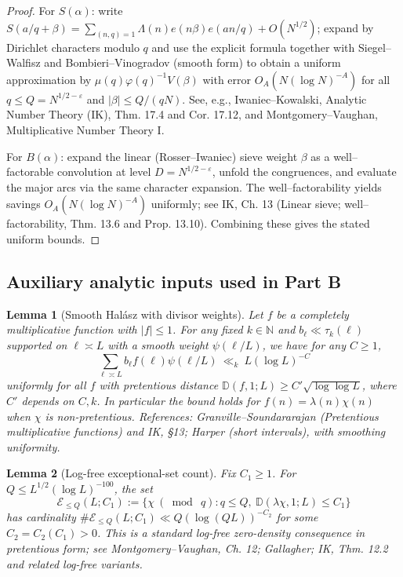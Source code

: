 \documentclass[11pt]{article}
\newtheorem{lemma}{Lemma}[part]
\theoremstyle{definition}
\theoremstyle{remark}
\numberwithin{equation}{part}
\begin{document}
\begin{proof}
	For $S(\alpha)$: write $S(a/q+\beta)=\sum_{(n,q)=1}\Lambda(n)e(n\beta)e(an/q)+O(N^{1/2})$; expand by Dirichlet characters modulo $q$ and use the explicit formula together with Siegel--Walfisz and Bombieri--Vinogradov (smooth form) to obtain a uniform approximation by $\mu(q)\varphi(q)^{-1}V(\beta)$ with error $O_A(N(\log N)^{-A})$ for all $q\le Q=N^{1/2-\varepsilon}$ and $|\beta|\le Q/(qN)$. See, e.g., Iwaniec--Kowalski, Analytic Number Theory (IK), Thm. 17.4 and Cor. 17.12, and Montgomery--Vaughan, Multiplicative Number Theory I.

	For $B(\alpha)$: expand the linear (Rosser--Iwaniec) sieve weight $\beta$ as a well--factorable convolution at level $D=N^{1/2-\varepsilon}$, unfold the congruences, and evaluate the major arcs via the same character expansion. The well--factorability yields savings $O_A(N(\log N)^{-A})$ uniformly; see IK, Ch. 13 (Linear sieve; well--factorability, Thm. 13.6 and Prop. 13.10). Combining these gives the stated uniform bounds.
\end{proof}

\subsection{Auxiliary analytic inputs used in Part B}

\begin{lemma}[Smooth Hal\'asz with divisor weights]\label{lem:halasz-smooth}
	Let $f$ be a completely multiplicative function with $|f|\le 1$. For any fixed $k\in\mathbb N$ and $b_\ell\ll \tau_k(\ell)$ supported on $\ell\asymp L$ with a smooth weight $\psi(\ell/L)$, we have for any $C\ge 1$,
	\[
		\sum_{\ell\asymp L} b_\ell f(\ell)\psi(\ell/L)\ \ll_{k}\ L(\log L)^{-C}
	\]
	uniformly for all $f$ with pretentious distance $\mathbb D(f,1;L)\ge C'\sqrt{\log\log L}$, where $C'$ depends on $C,k$. In particular the bound holds for $f(n)=\lambda(n)\chi(n)$ when $\chi$ is non-pretentious. References: Granville--Soundararajan (Pretentious multiplicative functions) and IK, §13; Harper (short intervals), with smoothing uniformity.
\end{lemma}

\begin{lemma}[Log-free exceptional-set count]\label{lem:logfree-density}
	Fix $C_1\ge 1$. For $Q\le L^{1/2}(\log L)^{-100}$, the set
	\[
		\mathcal E_{\le Q}(L;C_1):=\{\chi\ (\bmod\ q): q\le Q,\ \mathbb D(\lambda\chi,1;L)\le C_1\}
	\]
	has cardinality $\#\mathcal E_{\le Q}(L;C_1)\ll Q(\log (QL))^{-C_2}$ for some $C_2=C_2(C_1)>0$. This is a standard log-free zero-density consequence in pretentious form; see Montgomery--Vaughan, Ch. 12; Gallagher; IK, Thm. 12.2 and related log-free variants.
\end{lemma}
\end{document}
